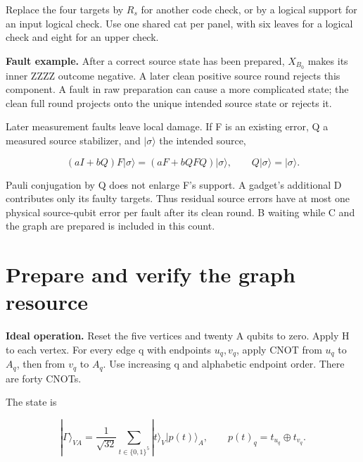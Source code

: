 \documentclass[11pt]{article}
\begin{document}
\begin{center}\begin{minipage}{\linewidth}

\end{minipage}\end{center}

Replace the four targets by \(R_s\) for another code check, or by a logical support for an input logical check. Use one shared cat per panel, with six leaves for a logical check and eight for an upper check.

\textbf{Fault example.} After a correct source state has been prepared, \(X_{B_0}\) makes its inner ZZZZ outcome negative. A later clean positive source round rejects this component. A fault in raw preparation can cause a more complicated state; the clean full round projects onto the unique intended source state or rejects it.

Later measurement faults leave local damage. If F is an existing error, Q a measured source stabilizer, and \(|\sigma\rangle\) the intended source,

\[
(aI+bQ)F|\sigma\rangle=(aF+bQFQ)|\sigma\rangle,
\qquad Q|\sigma\rangle=|\sigma\rangle.
\]

Pauli conjugation by Q does not enlarge F's support. A gadget's additional D contributes only its faulty targets. Thus residual source errors have at most one physical source-qubit error per fault after its clean round. B waiting while C and the graph are prepared is included in this count.

\section{Prepare and verify the graph resource}
\textbf{Ideal operation.} Reset the five vertices and twenty A qubits to zero. Apply H to each vertex. For every edge q with endpoints \(u_q,v_q\), apply CNOT from \(u_q\) to \(A_q\), then from \(v_q\) to \(A_q\). Use increasing q and alphabetic endpoint order. There are forty CNOTs.

The state is

\[
|\Gamma\rangle_{VA}=\frac1{\sqrt{32}}\sum_{t\in\{0,1\}^5}
|t\rangle_V|p(t)\rangle_A,\qquad p(t)_q=t_{u_q}\oplus t_{v_q}.
\]

\begin{center}\begin{minipage}{\linewidth}

\end{minipage}\end{center}
\end{document}
